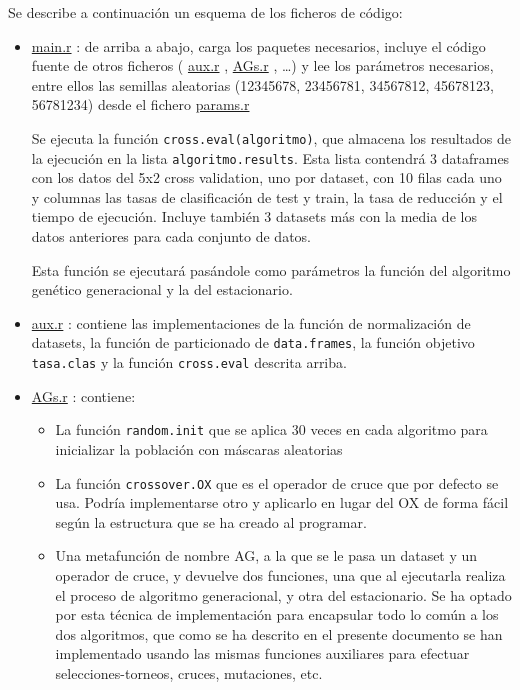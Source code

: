 \documentclass[a4paper,11pt]{article}
\newcommand{\hrefr}[1]{
\href{../bin/#1}{#1}
}
\begin{document}
Se describe a continuación un esquema de los ficheros de código:
\begin{itemize}
 \item \hrefr{main.r}: de arriba a abajo, carga los paquetes necesarios, incluye el código fuente de otros ficheros
  (\hrefr{aux.r}, \hrefr{AGs.r}, \ldots) y lee los parámetros necesarios, entre ellos las 
  semillas aleatorias (12345678, 23456781, 34567812, 45678123, 56781234) desde el fichero \hrefr{params.r}
  
  Se ejecuta la función \texttt{cross.eval(algoritmo)}, que almacena los resultados de la ejecución en la lista
  \texttt{algoritmo.results}. Esta lista contendrá 3 dataframes con los datos del 5x2 cross validation, uno por dataset, 
  con 10 filas cada uno  y columnas las tasas de clasificación de test y train, la tasa de reducción y el tiempo de 
  ejecución. Incluye también 3 datasets más con la media de los datos anteriores para cada conjunto de datos.
 
  Esta función se ejecutará pasándole como parámetros la función del algoritmo genético generacional y la del estacionario.
  
 \item \hrefr{aux.r}: contiene las implementaciones de la función de normalización de datasets, la función de
 particionado de \texttt{data.frames}, la función objetivo \texttt{tasa.clas} y la función \texttt{cross.eval}
 descrita arriba.
 
 \item \hrefr{AGs.r}: contiene:
  \begin{itemize}
   \item La función \texttt{random.init} que se aplica 30 veces en cada algoritmo para inicializar la
 población con máscaras aleatorias
   \item La función \texttt{crossover.OX} que es el operador de cruce que por defecto se usa. Podría implementarse otro y
   aplicarlo en lugar del OX de forma fácil según la estructura que se ha creado al programar.
   \item Una metafunción de nombre AG, a la que se le pasa un dataset y un operador de cruce, y devuelve dos funciones,
   una que al ejecutarla realiza el proceso de algoritmo generacional, y otra del estacionario. Se ha optado por esta 
   técnica de implementación para encapsular todo lo común a los dos algoritmos, que como se ha descrito en el presente
   documento se han implementado usando las mismas funciones auxiliares para efectuar selecciones-torneos, cruces, mutaciones,
   etc.
  \end{itemize}
 

\end{itemize}
\end{document}
